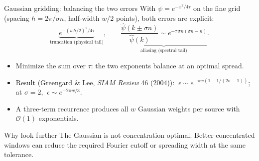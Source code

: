 \documentclass[aspectratio=169,11pt]{beamer}
\newcommand{\cO}{\mathcal{O}}
\newcommand{\gray}[1]{{\color{mygray}#1}}
\begin{document}
\begin{frame}{Gaussian gridding: balancing the two errors}
\small
With \(\psi=e^{-x^2/4\tau}\) on the fine grid (spacing \(h=2\pi/\sigma n\), half-width \(w/2\) points), both errors are explicit:
\[
  \underbrace{e^{-(wh/2)^2/4\tau}}_{\text{truncation (physical tail)}},\qquad
  \underbrace{\frac{\widehat\psi(k\pm\sigma n)}{\widehat\psi(k)}\sim e^{-\tau\,\sigma n(\sigma n-n)}}_{\text{aliasing (spectral tail)}}.
\]
\begin{itemize}
  \item Minimize the sum over \(\tau\): the two exponents balance at an optimal spread.
  \item Result \gray{(Greengard \& Lee, \emph{SIAM Review} 46 (2004))}: \(\ \epsilon\sim e^{-\pi w(1-1/(2\sigma-1))}\); at \(\sigma=2\), \(\ \epsilon\sim e^{-2\pi w/3}\).
  \item A three-term recurrence produces all \(w\) Gaussian weights per source with \(\cO(1)\) exponentials.
\end{itemize}
\begin{block}{Why look further}
The Gaussian is not concentration-optimal. Better-concentrated windows can reduce the required Fourier cutoff or spreading width at the same tolerance.
\end{block}
\end{frame}
\end{document}
